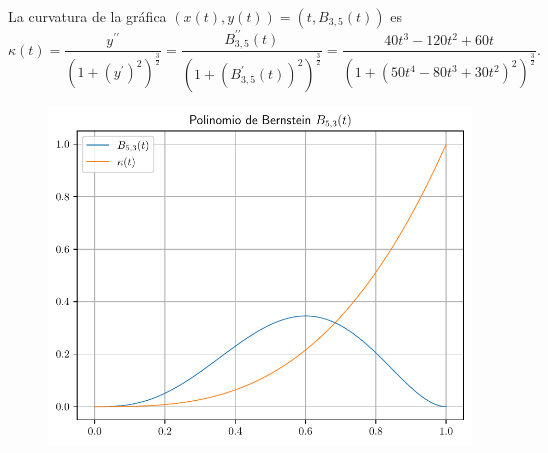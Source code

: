 \begin{frame}
\begin{solution}
        La curvatura de la gráfica
        \begin{math}
            \left(
            x\left(t\right),
            y\left(t\right)
            \right)=
            \left(
            t,
            B_{3,5}\left(t\right)
            \right)
        \end{math}
        es
        \begin{equation*}
            \kappa\left(t\right)=
            \dfrac{
                y^{\prime\prime}
            }{
                {\left(1+{\left(y^{\prime}\right)}^{2}\right)}^{\frac{3}{2}}
            }=
            \dfrac{
                B^{\prime\prime}_{3,5}\left(t\right)
            }{
                {\left(1+{\left(B^{\prime}_{3,5}\left(t\right)\right)}^{2}\right)}^{\frac{3}{2}}
            }=
            \dfrac{
            40t^{3}-120t^{2}+60t
            }{
            {\left(1+{\left(50t^{4}-80t^{3}+30t^{2}\right)}^{2}\right)}^{\frac{3}{2}}
            }.
        \end{equation*}
    \end{solution}
\end{frame}

\begin{frame}
    \begin{solution}
        \begin{figure}[ht!]
            \centering
            \includegraphics[width=.72\paperwidth]{p1}
        \end{figure}
    \end{solution}
\end{frame}